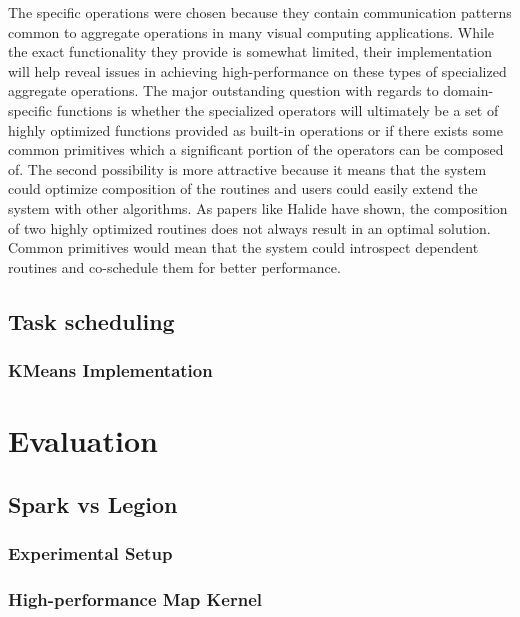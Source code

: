 \documentclass[tog]{acmsiggraph}
\begin{document}
The specific operations were chosen because they contain communication patterns
common to aggregate operations in many visual computing applications. While the
exact functionality they provide is somewhat limited, their implementation will
help reveal issues in achieving high-performance on these types of specialized
aggregate operations. The major outstanding question with regards to
domain-specific functions is whether the specialized operators will ultimately
be a set of highly optimized functions provided as built-in operations or if
there exists some common primitives which a significant portion of the
operators can be composed of. The second possibility is more attractive because
it means that the system could optimize composition of the routines and users
could easily extend the system with other algorithms. As papers like Halide
have shown, the composition of two highly optimized routines does not always
result in an optimal solution. Common primitives would mean that the system
could introspect dependent routines and co-schedule them for better
performance.



\subsection{Task scheduling}

\subsubsection{KMeans Implementation}

\section{Evaluation}

\subsection{Spark vs Legion}

\subsubsection{Experimental Setup}

\subsubsection{High-performance Map Kernel}
\end{document}
